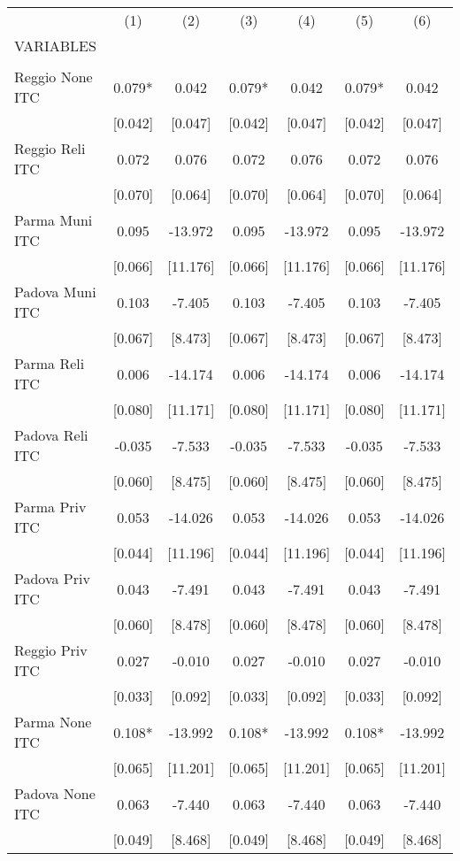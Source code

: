\begin{tabular}{lcccccc} \hline
 & (1) & (2) & (3) & (4) & (5) & (6) \\
VARIABLES &  &  &  &  &  &  \\ \hline
 &  &  &  &  &  &  \\
Reggio None ITC & 0.079* & 0.042 & 0.079* & 0.042 & 0.079* & 0.042 \\
 & [0.042] & [0.047] & [0.042] & [0.047] & [0.042] & [0.047] \\
Reggio Reli ITC & 0.072 & 0.076 & 0.072 & 0.076 & 0.072 & 0.076 \\
 & [0.070] & [0.064] & [0.070] & [0.064] & [0.070] & [0.064] \\
Parma Muni ITC & 0.095 & -13.972 & 0.095 & -13.972 & 0.095 & -13.972 \\
 & [0.066] & [11.176] & [0.066] & [11.176] & [0.066] & [11.176] \\
Padova Muni ITC & 0.103 & -7.405 & 0.103 & -7.405 & 0.103 & -7.405 \\
 & [0.067] & [8.473] & [0.067] & [8.473] & [0.067] & [8.473] \\
Parma Reli ITC & 0.006 & -14.174 & 0.006 & -14.174 & 0.006 & -14.174 \\
 & [0.080] & [11.171] & [0.080] & [11.171] & [0.080] & [11.171] \\
Padova Reli ITC & -0.035 & -7.533 & -0.035 & -7.533 & -0.035 & -7.533 \\
 & [0.060] & [8.475] & [0.060] & [8.475] & [0.060] & [8.475] \\
Parma Priv ITC & 0.053 & -14.026 & 0.053 & -14.026 & 0.053 & -14.026 \\
 & [0.044] & [11.196] & [0.044] & [11.196] & [0.044] & [11.196] \\
Padova Priv ITC & 0.043 & -7.491 & 0.043 & -7.491 & 0.043 & -7.491 \\
 & [0.060] & [8.478] & [0.060] & [8.478] & [0.060] & [8.478] \\
Reggio Priv ITC & 0.027 & -0.010 & 0.027 & -0.010 & 0.027 & -0.010 \\
 & [0.033] & [0.092] & [0.033] & [0.092] & [0.033] & [0.092] \\
Parma None ITC & 0.108* & -13.992 & 0.108* & -13.992 & 0.108* & -13.992 \\
 & [0.065] & [11.201] & [0.065] & [11.201] & [0.065] & [11.201] \\
Padova None ITC & 0.063 & -7.440 & 0.063 & -7.440 & 0.063 & -7.440 \\
 & [0.049] & [8.468] & [0.049] & [8.468] & [0.049] & [8.468] \\

\end{tabular}
